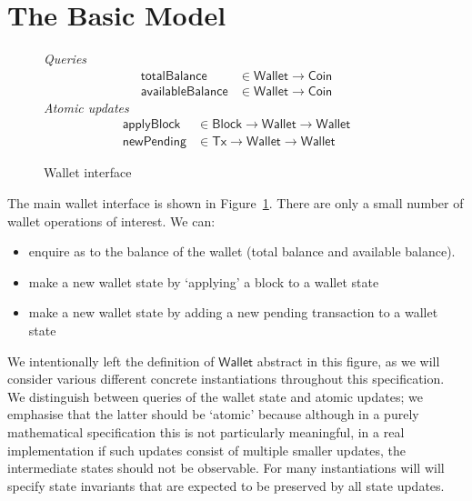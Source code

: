 \documentclass{article}
\numberwithin{equation}{lemma}
\begin{document}
\section{The Basic Model}
\label{sec:wallet_operations}

\begin{figure}
%
\emph{Queries}
%
\begin{align*}
  \mathsf{totalBalance}
& \in \mathsf{Wallet} \to \mathsf{Coin}
\\
  \mathsf{availableBalance}
& \in \mathsf{Wallet} \to \mathsf{Coin}
\end{align*}
%
\emph{Atomic updates}
%
\begin{align*}
  \mathsf{applyBlock}
& \in \mathsf{Block} \to \mathsf{Wallet} \to \mathsf{Wallet}
\\
  \mathsf{newPending}
& \in \mathsf{Tx} \to \mathsf{Wallet} \to \mathsf{Wallet}
\end{align*}

\caption{\label{fig:wallet_interface}Wallet interface}
\end{figure}

The main wallet interface is shown in Figure~\ref{fig:wallet_interface}. There
are only a small number of wallet operations of interest. We can:
%
\begin{itemize}
\item enquire as to the balance of the wallet (total balance and
      available balance).
\item make a new wallet state by `applying' a block to a wallet state
\item make a new wallet state by adding a new pending transaction to a wallet
      state
\end{itemize}
%
We intentionally left the definition of $\mathsf{Wallet}$ abstract in this
figure, as we will consider various different concrete instantiations throughout
this specification. We distinguish between queries of the wallet state
and atomic updates; we emphasise that the latter should be `atomic' because
although in a purely mathematical specification this is not particularly
meaningful, in a real implementation if such updates consist of multiple
smaller updates, the intermediate states should not be observable. For many
instantiations will will specify state invariants that are expected to be
preserved by all state updates.
\end{document}
